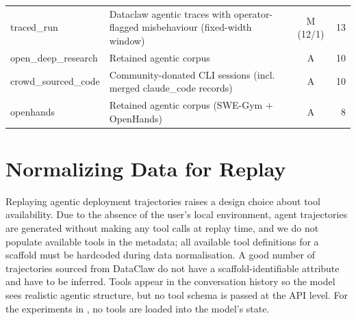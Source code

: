 \documentclass{article}
\begin{document}
\begin{table}[!htbp]
\begin{tabular}{p{3.4cm}p{6.6cm}cr}
traced\_run \citep{tracedrun2026}    & Dataclaw agentic traces with operator-flagged misbehaviour (fixed-width window) & M (12/1) & 13 \\
open\_deep\_research \citep{roucher2025smolagents} & Retained agentic corpus                                     & A          & 10  \\
crowd\_sourced\_code \citep{yan2026sharechat}                & Community-donated CLI sessions (incl. merged claude\_code records)        & A          & 10  \\
openhands \citep{wang2024openhands}  & Retained agentic corpus (SWE-Gym + OpenHands)                             & A          & 8   \\
\bottomrule
\end{tabular}
\end{table}

\section{Normalizing Data for Replay}
\label{sec:appendix_replay}

Replaying agentic deployment trajectories raises a design choice about
tool availability. Due to the absence of the user's local environment,
agent trajectories are generated without making any tool calls at
replay time, and we do not populate available tools in the metadata;
all available tool definitions for a scaffold must be hardcoded during
data normalisation. A good number of trajectories sourced from
DataClaw do not have a scaffold-identifiable attribute and have to be
inferred. Tools appear in the conversation history so the model sees
realistic agentic structure, but no tool schema is passed at the API
level. For the experiments in , no tools are
loaded into the model's state.
\end{document}
